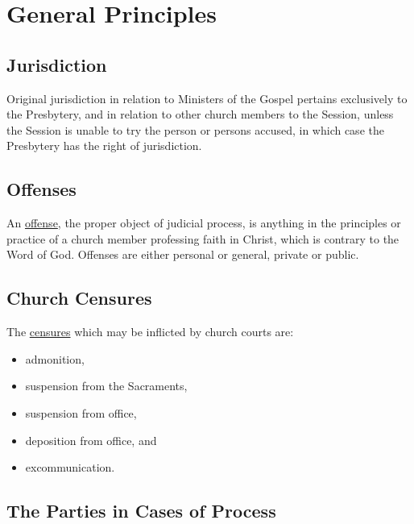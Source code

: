 \documentclass[
]{book}
\providecommand{\tightlist}{%
  \setlength{\itemsep}{0pt}\setlength{\parskip}{0pt}}
\begin{document}
\hypertarget{general-principles}{%
\section{General Principles}\label{general-principles}}

\hypertarget{jurisdiction}{%
\subsection{Jurisdiction}\label{jurisdiction}}

Original jurisdiction in relation to Ministers of the Gospel pertains exclusively to the Presbytery, and in relation to other church members to the Session, unless the Session is unable to try the person or persons accused, in which case the Presbytery has the right of jurisdiction.

\hypertarget{offenses}{%
\subsection{Offenses}\label{offenses}}

An \href{https://evangel.pressbooks.com/chapter/32-offenses/}{offense}, the proper object of judicial process, is anything in the principles or practice of a church member professing faith in Christ, which is contrary to the Word of God. Offenses are either personal or general, private or public.

\hypertarget{church-censures}{%
\subsection{Church Censures}\label{church-censures}}

The \href{https://evangel.pressbooks.com/chapter/33-church-censures/}{censures} which may be inflicted by church courts are:

\begin{itemize}
\tightlist
\item
  admonition,
\item
  suspension from the Sacraments,
\item
  suspension from office,
\item
  deposition from office, and
\item
  excommunication.
\end{itemize}

\hypertarget{the-parties-in-cases-of-process}{%
\subsection{The Parties in Cases of Process}\label{the-parties-in-cases-of-process}}
\end{document}
